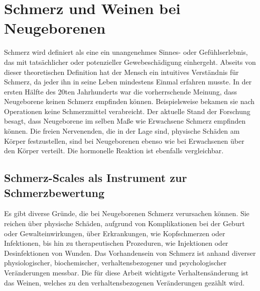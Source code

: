 \section{Schmerz und Weinen bei Neugeborenen}
\label{sec:medicalFoundations} 

Schmerz wird definiert als eine \glqq ein unangenehmes Sinnes- oder Gefühlserlebnis, das mit tatsächlicher oder potenzieller Gewebeschädigung einhergeht\grqq{}.\cite[S. 438]{PainAssessment01} Abseits von dieser theoretischen Definition hat der Mensch ein intuitives Verständnis für Schmerz, da jeder ihn in seine Leben mindestens Einmal erfahren musste. In der ersten Hälfte des 20ten Jahrhunderts war die vorherrschende Meinung, dass Neugeborene keinen Schmerz empfinden können. Beispielsweise bekamen sie nach Operationen keine Schmerzmittel verabreicht. Der aktuelle Stand der Forschung besagt, dass Neugeborene im selben Maße wie Erwachsene Schmerz empfinden können. Die freien Nervenenden, die in der Lage sind, physische Schäden am Körper festzustellen, sind bei Neugeborenen ebenso wie bei Erwachsenen über den Körper verteilt. Die hormonelle Reaktion ist ebenfalls vergleichbar. \cite[S. 402]{PainAssessment03} \cite[S. 438]{PainAssessment01}

\subsection{Schmerz-Scales als Instrument zur Schmerzbewertung}
\label{sec:painScores}

Es gibt diverse Gründe, die bei Neugeborenen Schmerz verursachen können. Sie reichen über physische Schäden, aufgrund von Komplikationen bei der Geburt oder Gewalteinwirkungen, über Erkrankungen, wie Kopfschmerzen oder Infektionen, bis hin zu therapeutischen Prozeduren, wie Injektionen oder Desinfektionen von Wunden. Das Vorhandensein von Schmerz ist anhand diverser physiologischer, biochemischer, verhaltensbezogener und psychologischer Veränderungen messbar. Die für diese Arbeit wichtigste Verhaltensänderung ist das Weinen, welches zu den verhaltensbezogenen Veränderungen gezählt wird.\cite[S. 441]{PainAssessment01} 

